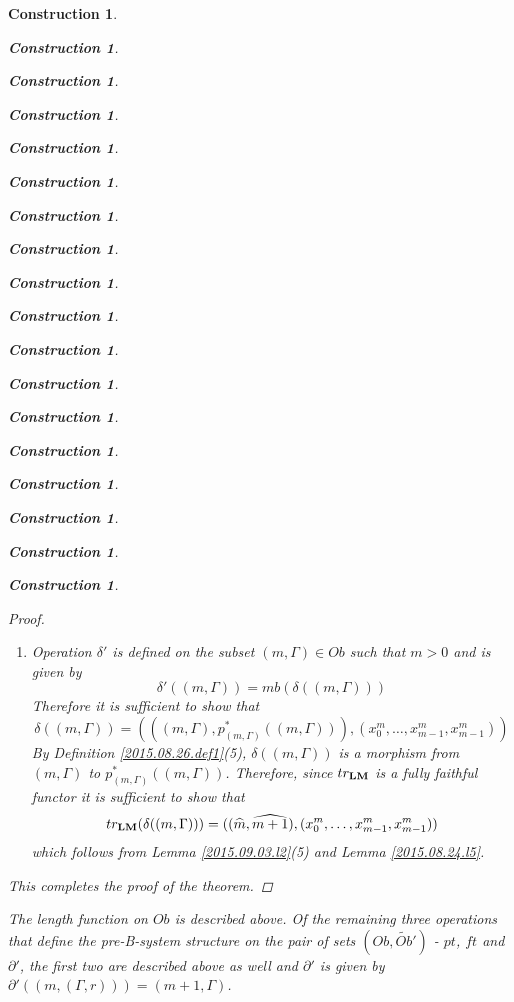 \documentclass[12pt]{amsart}
\newenvironment{eq}{\begin{equation}}{\end{equation}}
\newtheorem{construction}[proposition]{Construction}
\newcommand{\llabel}[1]{\label{#1}[{\bf #1}]}
\newcommand{\wt}{\widetilde}
\newcommand{\wh}{\widehat}
\newcommand{\LM}{{\bf LM}}
\begin{document}
\begin{construction}
\begin{construction}
\begin{construction}
\begin{construction}
\begin{construction}
\begin{construction}
\begin{construction}
\begin{construction}
\begin{construction}
\begin{construction}
\begin{construction}
\begin{construction}
\begin{construction}
\begin{construction}
\begin{construction}
\begin{construction}
\begin{construction}
\begin{construction}
\begin{proof}
\begin{enumerate}
\begin{eq}\llabel{2016.01.21.eq1}
\partial(mb^!((n,(\Gamma',s))))>\partial(mb^!(m,(\Gamma,r)))
\end{eq}
%
and takes values in $\wt{Ob}'$. The inequality (\ref{2016.01.21.eq1}) is equivalent to 
%
$$(n+1,\Gamma')>(m+1,\Gamma)$$
%
which is, in turn, equivalent to the conditions in the theorem. In the computation  below let us sometimes abbreviate $((X,Y),f)$ to $f$. Let
%
$$rr=(x_0^m,\dots,x_{m-1}^m,r)$$
$$ss=(x_0^n,\dots,x_{n-1}^n,s)$$
%
Then the operation itself is given by:
%
$$\wt{S}'((m,(\Gamma,r)),(n,(\Gamma',s)))=mb((mb^!(m,(\Gamma,r)))^*(mb^!((n,(\Gamma',s)))))=mb(rr^*ss)=$$$$mb((x_0^{n-1},\dots,x^{n-1}_{n-2},(qq^{n-m-1}(rr))(s)))=(n-1,(rr^*((n+1,\Gamma')),(qq^{n-m-1}(rr))(s)))=$$
$$(n-1,(S'((m,(\Gamma,r)),(n+1,\Gamma'))),\theta_{m,n}(r,s))$$
%
where the third equality is by Lemma \ref{2015.09.03.l1} and the fifth by (\ref{2016.01.21.eq2}) and the definition of $\theta_{m,n}(r,s)$. 
%
\item Operation $\delta'$ is defined on the subset $(m,\Gamma)\in Ob$ such that $m>0$ and is given by
%
$$\delta'((m,\Gamma))=mb(\delta((m,\Gamma)))$$
%
Therefore it is sufficient to show that
%
$$\delta((m,\Gamma))=(((m,\Gamma),p_{(m,\Gamma)}^*((m,\Gamma))),(x_0^m,\dots,x_{m-1}^m,x_{m-1}^m))$$
%
By Definition \ref{2015.08.26.def1}(5), $\delta((m,\Gamma))$ is a morphism from $(m,\Gamma)$ to $p_{(m,\Gamma)}^*((m,\Gamma))$. Therefore, since $tr_{\LM}$ is a fully faithful functor it is sufficient to show that 
%
$$tr_{\LM}(\delta((m,\Gamma)))=((\wh{m},\wh{m+1}),(x_0^m,\dots,x_{m-1}^m,x_{m-1}^m))$$
%
which follows from Lemma \ref{2015.09.03.l2}(5) and Lemma \ref{2015.08.24.l5}.
%
\end{enumerate}
%
This completes the proof of the theorem. 
\end{proof}
%
The length function on $Ob$ is described above. Of the remaining three operations that define the pre-B-system structure on the pair of sets $(Ob,\wt{Ob}')$ - $pt$, $ft$ and $\partial'$, the first two are described above as well and $\partial'$ is given by $\partial'((m,(\Gamma,r)))=(m+1,\Gamma)$. 


\end{construction}
\end{construction}
\end{construction}
\end{construction}
\end{construction}
\end{construction}
\end{construction}
\end{construction}
\end{construction}
\end{construction}
\end{construction}
\end{construction}
\end{construction}
\end{construction}
\end{construction}
\end{construction}
\end{construction}
\end{construction}
\end{document}
